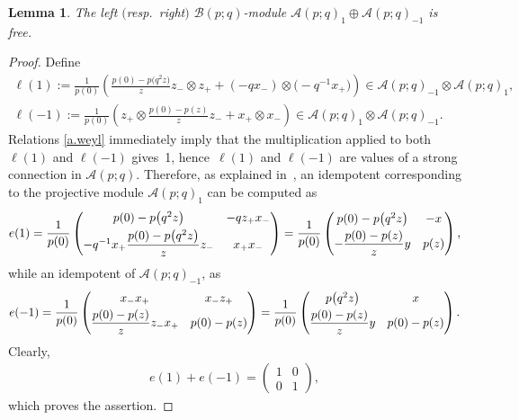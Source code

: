 \documentclass[pdftex]{sigma}
\numberwithin{equation}{section}
\newtheorem{Lemma}[Theorem]{Lemma}
\def\Weyl#1#2{{\mathcal{B}}(#1;#2)}
\def\AWeyl#1#2{{\mathcal{A}}(#1;#2)}
\begin{document}
\begin{Lemma}\label{lemma.spinor}
The left $($resp.\ right$)$ $\Weyl p q$-module $\AWeyl p q_{1} \oplus \AWeyl p q_{-1}$ is free.
\end{Lemma}
\begin{proof}
Def\/ine
\begin{gather*}
\ell(1) := \frac{1}{p(0)} \left(\frac{p(0) - p\big(q^2 z\big)}{z} z_-\otimes z_+ + (-qx_-)\otimes \big({-}q^{-1}x_+\big)\right)\in \AWeyl p q_{-1}\otimes \AWeyl p q_{1}, \\
\ell(-1) := \frac{1}{p(0)} \left({z_+} \otimes \frac{p(0) - p(z)}{z} z_- + x_+\otimes x_-\right)\in \AWeyl p q_{1}\otimes \AWeyl p q_{-1} .
\end{gather*}
Relations \eqref{a.weyl} immediately imply that the multiplication applied to both $\ell(1)$ and $\ell(-1)$ gives~1, hence~$\ell(1)$ and $\ell(-1)$ are values of a strong connection in $\AWeyl p q$. Therefore, as explained in~\cite{BrzHaj:Che}, an idempotent corresponding to the projective module $\AWeyl p q_{1} $ can be computed as
\begin{gather*}
e(1) = \frac{1}{p(0)}\begin{pmatrix}
p(0) - p\big(q^2 z\big) & -qz_+x_- \vspace{1mm}\\
-q^{-1}x_+ \dfrac{p(0) - p\big(q^2 z\big)}{z} z_- & x_+x_-
\end{pmatrix}
=
\frac{1}{p(0)}\begin{pmatrix}
p(0) - p\big(q^2 z\big) & -x \vspace{1mm}\\
- \dfrac{p(0) - p(z)}{z} y &p(z)
\end{pmatrix},
\end{gather*}
while an idempotent of $\AWeyl p q_{-1} $, as
\begin{gather*}
e(-1) = \frac{1}{p(0)}\begin{pmatrix}
x_-x_+ & x_-z_+ \vspace{1mm}\\
 \dfrac{p(0) - p(z)}{z} z_-x_+ & p(0)-p(z)
\end{pmatrix}
=
\frac{1}{p(0)}\begin{pmatrix}
p\big(q^2 z\big) & x \vspace{1mm}\\
 \dfrac{p(0) - p(z)}{z} y & p(0)-p(z)
\end{pmatrix}.
\end{gather*}
Clearly,
\begin{gather*}
e(1)+e(-1) = \begin{pmatrix}
1 & 0\\ 0 &1 \end{pmatrix},
\end{gather*}
which proves the assertion.
\end{proof}
\end{document}
